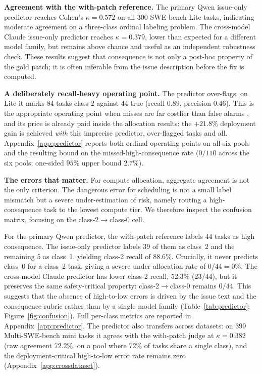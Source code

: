 \documentclass{article}
\begin{document}
\textbf{Agreement with the with-patch reference.} The primary Qwen
issue-only predictor reaches Cohen's $\kappa = 0.572$ on all $300$ SWE-bench Lite tasks, indicating moderate agreement on a three-class ordinal labeling problem. The cross-model Claude issue-only predictor reaches $\kappa = 0.379$, lower than expected for a
different model family, but remains above chance and useful as an independent robustness check. These results suggest that consequence is not only a post-hoc property of the gold patch; it is often inferable from the issue description before the fix is computed.

\textbf{A deliberately recall-heavy operating point.} The predictor
over-flags: on Lite it marks $84$ tasks class-$2$ against $44$ true
(recall $0.89$, precision $0.46$). This is the appropriate operating
point when misses are far costlier than false alarms
\citep{elkan2001foundations}, and its price is already paid inside
the allocation results: the $+21.8\%$ deployment gain is achieved
\emph{with} this imprecise predictor, over-flagged tasks and all.
Appendix~\ref{app:predictor} reports both ordinal operating points on
all six pools and the resulting bound on the missed-high-consequence
rate ($0/110$ across the six pools; one-sided $95\%$ upper bound $2.7\%$).

\textbf{The errors that matter.} For compute allocation, aggregate agreement is not the only criterion. The dangerous error for scheduling is not a small
label mismatch but a severe under-estimation of risk, namely routing a
high-consequence task to the lowest compute tier. We therefore inspect
the confusion matrix, focusing on the class-2$\to$class-0 cell.

For the primary Qwen predictor, the with-patch reference labels $44$ tasks as high consequence. The issue-only predictor labels $39$ of them as class~2 and the remaining $5$ as class~1, yielding class-2
recall of $88.6\%$. Crucially, it never predicts class~0 for a class~2 task, giving a severe under-allocation rate of
$0/44 = 0\%$. The cross-model Claude predictor has lower class-2
recall, $52.3\%$ ($23/44$), but it preserves the same safety-critical
property: class-2$\to$class-0 remains $0/44$. This suggests that the
absence of high-to-low errors is driven by the issue text and the
consequence rubric rather than by a single model family (Table~\ref{tab:predictor}; Figure~\ref{fig:confusion}). Full per-class metrics are reported in Appendix~\ref{app:predictor}.
The predictor also transfers across datasets: on $399$
Multi-SWE-bench mini tasks it agrees with the with-patch judge at
$\kappa = 0.382$ (raw agreement $72.2\%$, on a pool where $72\%$ of
tasks share a single class), and the deployment-critical high-to-low
error rate remains zero (Appendix~\ref{app:crossdataset}).
\end{document}
